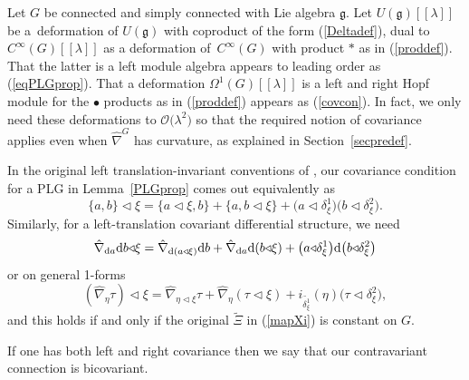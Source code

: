\documentclass[pdftex]{sigma}
\numberwithin{equation}{section}
\newcommand{\<}{{\langle}}
\renewcommand{\>}{{\rangle}}
\newcommand{\extd}{{\rm d}}
\newcommand{\ra}{{\triangleleft}}
\newcommand{\cg}{{\mathfrak{g}}}
\begin{document}
\begin{Remark}\label{actionconn} Let $G$ be connected and simply connected with Lie algebra $\cg$. Let $U(\cg)[[\lambda]]$ be a~deformation of $U(\cg)$ with coproduct of the form (\ref{Deltadef}), dual to $C^\infty(G)[[\lambda]]$ as a deformation of~$C^\infty(G)$ with product $*$ as in (\ref{proddef}). That the latter is a left module algebra appears to leading order as (\ref{eqPLGprop}). That a deformation $\Omega^1(G)[[\lambda]]$ is a left and right Hopf module for the $\bullet$ products as in (\ref{proddef}) appears as (\ref{covcon}). In fact, we only need these deformations to $\mathcal{O}\big(\lambda^2\big)$ so that the required notion of covariance applies even when $\hat\nabla^G$ has curvature, as explained in Section~\ref{secpredef}.
 \end{Remark}

\begin{Remark}\label{leftinvversion} In the original left translation-invariant conventions of \cite{BegMa:sem,MaTao:plg}, our covariance condition for a PLG in Lemma~\ref{PLGprop} comes out equivalently as
\begin{equation}\label{actionPBright}
\{ a,b\}\ra\xi=\{a\ra\xi,b\}+\{a,b\ra\xi\}+\big(a\ra\delta_\xi^1\big)\big(b\ra\delta^2_\xi\big).
\end{equation}
Similarly, for a left-translation covariant differential structure, we need
\begin{equation*}%
\hat\nabla_{\extd a}\extd b\ra\xi=\hat\nabla_{\extd(a\ra\xi)}\extd b+\hat\nabla_{\extd a}\extd(b\ra\xi)+\big(a\ra\delta_\xi^1\big)\extd\big(b\ra\delta_\xi^2\big)
\end{equation*}
or on general 1-forms
\begin{equation}\label{generalactionconnright}
(\hat\nabla_{\eta}\tau)\ra\xi=\hat\nabla_{\eta\ra\xi}\tau+\hat\nabla_{\eta}(\tau\ra\xi)+i_{\tilde{\delta_\xi^1}}(\eta) \big(\tau\ra\delta_\xi^2\big),
\end{equation}
and this holds if and only if the original $\tilde\Xi$ in (\ref{mapXi}) is constant on $G$.
\end{Remark}

If one has both left and right covariance then we say that our contravariant connection is bicovariant.
\end{document}
